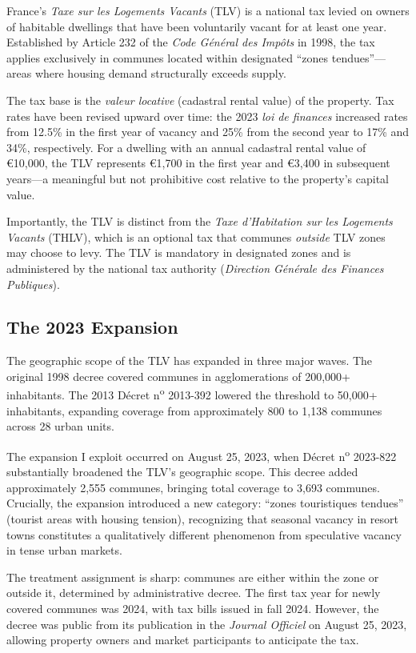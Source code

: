 \documentclass[12pt]{article}
\begin{document}
France's \textit{Taxe sur les Logements Vacants} (TLV) is a national tax levied on owners of habitable dwellings that have been voluntarily vacant for at least one year. Established by Article 232 of the \textit{Code G\'en\'eral des Imp\^ots} in 1998, the tax applies exclusively in communes located within designated ``zones tendues''---areas where housing demand structurally exceeds supply.

The tax base is the \textit{valeur locative} (cadastral rental value) of the property. Tax rates have been revised upward over time: the 2023 \textit{loi de finances} increased rates from 12.5\% in the first year of vacancy and 25\% from the second year to 17\% and 34\%, respectively. For a dwelling with an annual cadastral rental value of \euro{10,000}, the TLV represents \euro{1,700} in the first year and \euro{3,400} in subsequent years---a meaningful but not prohibitive cost relative to the property's capital value.

Importantly, the TLV is distinct from the \textit{Taxe d'Habitation sur les Logements Vacants} (THLV), which is an optional tax that communes \textit{outside} TLV zones may choose to levy. The TLV is mandatory in designated zones and is administered by the national tax authority (\textit{Direction G\'en\'erale des Finances Publiques}).

\subsection{The 2023 Expansion}

The geographic scope of the TLV has expanded in three major waves. The original 1998 decree covered communes in agglomerations of 200,000+ inhabitants. The 2013 D\'ecret n\textsuperscript{o} 2013-392 lowered the threshold to 50,000+ inhabitants, expanding coverage from approximately 800 to 1,138 communes across 28 urban units.

The expansion I exploit occurred on August 25, 2023, when D\'ecret n\textsuperscript{o} 2023-822 substantially broadened the TLV's geographic scope. This decree added approximately 2,555 communes, bringing total coverage to 3,693 communes. Crucially, the expansion introduced a new category: ``zones touristiques tendues'' (tourist areas with housing tension), recognizing that seasonal vacancy in resort towns constitutes a qualitatively different phenomenon from speculative vacancy in tense urban markets.

The treatment assignment is sharp: communes are either within the zone or outside it, determined by administrative decree. The first tax year for newly covered communes was 2024, with tax bills issued in fall 2024. However, the decree was public from its publication in the \textit{Journal Officiel} on August 25, 2023, allowing property owners and market participants to anticipate the tax.
\end{document}
